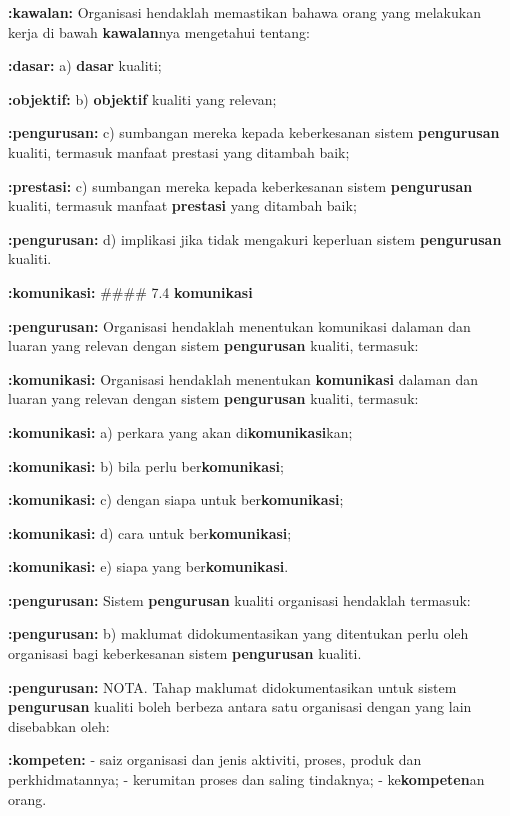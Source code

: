 \documentclass{article}
\begin{document}
\textbf{:kawalan:} Organisasi hendaklah memastikan bahawa orang yang melakukan kerja di bawah
\textbf{kawalan}nya mengetahui tentang:

\textbf{:dasar:} a) \textbf{dasar} kualiti;

\textbf{:objektif:} b) \textbf{objektif} kualiti yang relevan;

\textbf{:pengurusan:} c) sumbangan mereka kepada keberkesanan sistem \textbf{pengurusan} kualiti, termasuk manfaat
prestasi yang ditambah baik;

\textbf{:prestasi:} c) sumbangan mereka kepada keberkesanan sistem \textbf{pengurusan} kualiti, termasuk manfaat
\textbf{prestasi} yang ditambah baik;

\textbf{:pengurusan:} d) implikasi jika tidak mengakuri keperluan sistem \textbf{pengurusan} kualiti.

\textbf{:komunikasi:} \#\#\#\# 7.4 \textbf{komunikasi}

\textbf{:pengurusan:} Organisasi hendaklah menentukan komunikasi dalaman dan luaran yang relevan dengan
sistem \textbf{pengurusan} kualiti, termasuk:

\textbf{:komunikasi:} Organisasi hendaklah menentukan \textbf{komunikasi} dalaman dan luaran yang relevan dengan
sistem \textbf{pengurusan} kualiti, termasuk:

\textbf{:komunikasi:} a) perkara yang akan di\textbf{komunikasi}kan;

\textbf{:komunikasi:} b) bila perlu ber\textbf{komunikasi};

\textbf{:komunikasi:} c) dengan siapa untuk ber\textbf{komunikasi};

\textbf{:komunikasi:} d) cara untuk ber\textbf{komunikasi};

\textbf{:komunikasi:} e) siapa yang ber\textbf{komunikasi}.

\textbf{:pengurusan:} Sistem \textbf{pengurusan} kualiti organisasi hendaklah termasuk:

\textbf{:pengurusan:} b) maklumat didokumentasikan yang ditentukan perlu oleh organisasi bagi keberkesanan
sistem \textbf{pengurusan} kualiti.

\textbf{:pengurusan:} NOTA. Tahap maklumat didokumentasikan untuk sistem \textbf{pengurusan} kualiti boleh berbeza antara satu
organisasi dengan yang lain disebabkan oleh:

\textbf{:kompeten:} - saiz organisasi dan jenis aktiviti, proses, produk dan perkhidmatannya;
- kerumitan proses dan saling tindaknya;
- ke\textbf{kompeten}an orang.
\end{document}
